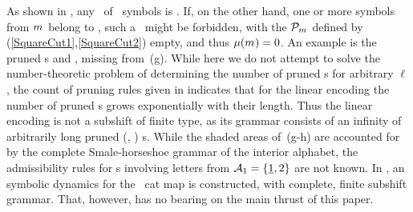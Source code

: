 \documentclass[12pt]{iopart}
\begin{document}
As shown in , any \brick\ of \Ai\ symbols is
{\admissible}. If, on the other hand, one or more symbols from ${m_{}}$ belong
to \Ae, such a \brick\ might be forbidden, with the  $\mathcal{P}_{{m_{}}}$
defined  by (\ref{SquareCut1},\ref{SquareCut2}) empty, and thus ${\mu}({m_{}})=0$.
An example is the pruned \brick s  and
, missing from \,(g). While here we
do not attempt to solve the number-theoretic problem of determining the
number of pruned \brick s for arbitrary $\ell$, the count of pruning
rules given in  indicates that for the linear {encoding}
the number of pruned \brick s grows exponentially with their length. Thus
the linear {encoding} is not a subshift of finite type, as  its grammar
consists of an infinity of arbitrarily long pruned (\ie, \edit{\inadmissible})
{\brick s}.
While the shaded areas of \,(g-h) are
accounted for by the complete Smale-horseshoe grammar of the interior
alphabet, the admissibility  rules for  {\brick}s involving  letters
from $\mathcal{A}_1=\{\underline{1},2\}$  are not known.
In , an  symbolic dynamics for the \PV\ cat map
 is constructed, with complete, finite subshift
grammar. That, however, has no bearing on  the main thrust of this paper.
\end{document}
